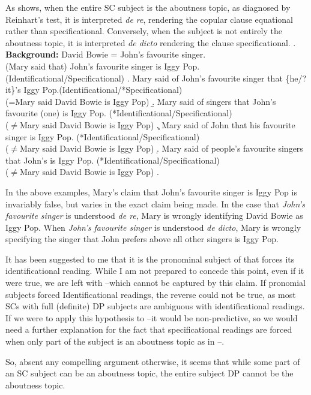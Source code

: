 \documentclass[GPFinal]{subfiles}
\begin{document}
As \Next shows, when the entire SC subject is the aboutness topic, as diagnosed by Reinhart's test, it is interpreted \textit{de re}, rendering the copular clause equational rather than specificational.
Conversely, when the subject is not entirely the aboutness topic, it is interpreted \textit{de dicto} rendering the clause specificational.
\ex. \textbf{Background:} David Bowie = John's favourite singer.\\
(Mary said that) John's favourite singer is Iggy Pop. (Identificational/Specificational)
\a. Mary said of John's favourite singer that \{he/?it\}'s Iggy Pop.(Identificational/*Specificational)\\
(=Mary said David Bowie is Iggy Pop)
\b. Mary said of singers that John's favourite (one) is Iggy Pop. (*Identificational/Specificational)\\
($\neq$Mary said David Bowie is Iggy Pop)
\c. Mary said of John that his favourite singer is Iggy Pop. (*Identificational/Specificational)\\
($\neq$Mary said David Bowie is Iggy Pop)
\d. Mary said of people's favourite singers that John's is Iggy Pop. (*Identificational/Specificational)\\
($\neq$Mary said David Bowie is Iggy Pop)
\z.

In the above examples, Mary's claim that John's favourite singer is Iggy Pop is invariably false, but varies in the exact claim being made.
In the case that \textit{John's favourite singer} is understood \textit{de re}, Mary is wrongly identifying David Bowie as Iggy Pop.
When \textit{John's favourite singer} is understood \textit{de dicto}, Mary is wrongly specifying the singer that John prefers above all other singers is Iggy Pop.

It has been suggested to me that it is the pronominal subject of \Last[a] that forces its identificational reading.
While I am not prepared to concede this point, even if it were true, we are left with \Last[b]--\Last[d] which cannot be captured by this claim.
If pronomial subjects forced Identificational readings, the reverse could not be true, as most SCs with full (definite) DP subjects are ambiguous with identificational readings.
If we were to apply this hypothesis to \Last[b]--\Last[d] it would be non-predictive, so we would need a further explanation for the fact that specificational readings are forced when only part of the subject is an aboutness topic as in \Last[b]--\Last[d].

So, absent any compelling argument otherwise, it seems that while some part of an SC subject can be an aboutness topic, the entire subject DP cannot be the aboutness topic.
\end{document}
